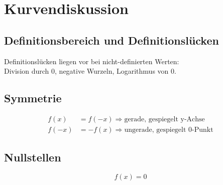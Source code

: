 \section{Kurvendiskussion}
% 

\subsection{Definitionsbereich und Definitionslücken}
Definitionslücken liegen vor bei nicht-definierten Werten:\\
Division durch 0, negative Wurzeln, Logarithmus von 0.\\

\subsection{Symmetrie}
\begin{align*}
	f(x)& = f(-x) \Rightarrow \mbox{gerade, gespiegelt y-Achse}\\
	f(-x)& = -f(x) \Rightarrow \mbox{ungerade, gespiegelt 0-Punkt}
\end{align*}

\subsection{Nullstellen}
\begin{equation*}
	f(x) = 0	
\end{equation*}

